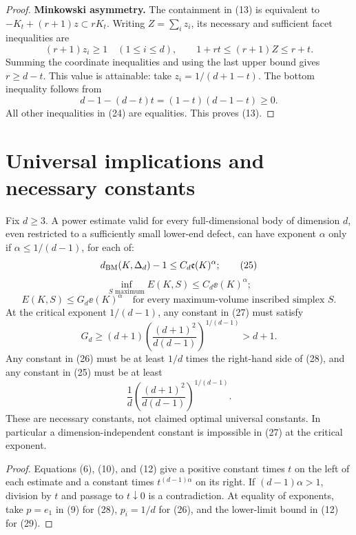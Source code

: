 \begin{proof}
\medskip\noindent\textbf{Minkowski asymmetry.}
The containment in (13) is equivalent to
$-K_t+(r+1)z\subset rK_t$. Writing $Z=\sum_i z_i$, its necessary and
sufficient facet inequalities are
\[
 (r+1)z_i\ge1\quad(1\le i\le d),\qquad
 1+rt\le(r+1)Z\le r+t.
 \tag{24}
\]
Summing the coordinate inequalities and using the last upper bound gives
$r\ge d-t$. This value is attainable: take
$z_i=1/(d+1-t)$. The bottom inequality follows from
\[
 d-1-(d-t)t=(1-t)(d-1-t)\ge0.
\]
All other inequalities in (24) are equalities. This proves (13).
\end{proof}

\section{Universal implications and necessary constants}

\begin{corollary}\label{cor:power}
Fix $d\ge3$. A power estimate valid for every full-dimensional body of
dimension $d$, even restricted to a sufficiently small lower-end defect,
can have exponent $\alpha$ only if $\alpha\le1/(d-1)$, for each of:
\[
 d_{\mathrm{BM}}(K,\Delta_d)-1\le C_d\mathfrak e(K)^\alpha;
 \tag{25}
\]
\[
 \inf_{S\text{ maximum}}E(K,S)\le C_d\ee(K)^\alpha;
 \tag{26}
\]
\[
 E(K,S)\le G_d\ee(K)^\alpha
 \quad\text{for every maximum-volume inscribed simplex }S.
 \tag{27}
\]
At the critical exponent $1/(d-1)$, any constant in (27) must satisfy
\[
 G_d\ge(d+1)\left(\frac{(d+1)^2}{d(d-1)}\right)^{1/(d-1)}>d+1.
 \tag{28}
\]
Any constant in (26) must be at least $1/d$ times the right-hand side of
(28), and any constant in (25) must be at least
\[
 \frac1d\left(\frac{(d+1)^2}{d(d-1)}\right)^{1/(d-1)}.
 \tag{29}
\]
These are necessary constants, not claimed optimal universal constants.
In particular a dimension-independent constant is impossible in (27)
at the critical exponent.
\end{corollary}

\begin{proof}
Equations (6), (10), and (12) give a positive constant times $t$ on the
left of each estimate and a constant times $t^{(d-1)\alpha}$ on its right.
If $(d-1)\alpha>1$, division by $t$ and passage to $t\downarrow0$ is a
contradiction. At equality of exponents, take $p=e_1$ in (9) for (28),
$p_i=1/d$ for (26), and the lower-limit bound in (12) for (29).
\end{proof}
